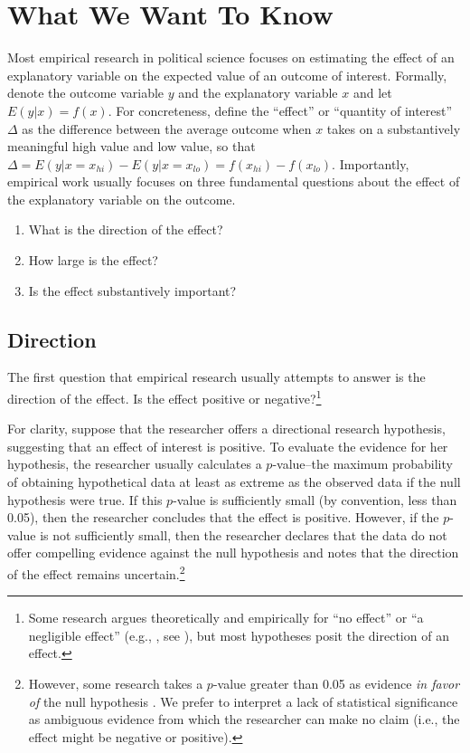 \documentclass[12pt]{article}
\begin{document}
\section*{What We Want To Know}

Most empirical research in political science focuses on estimating the effect of an explanatory variable on the expected value of an outcome of interest. Formally, denote the outcome variable $y$ and the explanatory variable $x$ and let $E(y | x) = f(x)$. For concreteness, define the ``effect'' or ``quantity of interest'' $\Delta$ as the difference between the average outcome when $x$ takes on a substantively meaningful high value and low value, so that $\Delta = E(y | x = x_{hi}) - E(y | x = x_{lo}) = f(x_{hi}) - f(x_{lo})$. Importantly, empirical work usually focuses on three fundamental questions about the effect of the explanatory variable on the outcome.

\begin{enumerate}
\item What is the direction of the effect?
\item How large is the effect?
\item Is the effect substantively important?
\end{enumerate}

\subsection*{Direction}

The first question that empirical research usually attempts to answer is the direction of the effect. Is the effect positive or negative?\footnote{Some research argues theoretically and empirically for ``no effect'' or ``a negligible effect'' (e.g., \citealt{KamPalmer2008}, see \citealt{Rainey2014a}), but most hypotheses posit the direction of an effect.} 

For clarity, suppose that the researcher offers a directional research hypothesis, suggesting that an effect of interest is positive. To evaluate the evidence for her hypothesis, the researcher usually calculates a $p$-value--the maximum probability of obtaining hypothetical data at least as extreme as the observed data if the null hypothesis were true. If this $p$-value is sufficiently small (by convention, less than 0.05), then the researcher concludes that the effect is positive. However, if the $p$-value is not sufficiently small, then the researcher declares that the data do not offer compelling evidence against the null hypothesis and notes that the direction of the effect remains uncertain.\footnote{However, some research takes a $p$-value greater than 0.05 as evidence \textit{in favor of} the null hypothesis \citep{Rainey2014a}. We prefer to interpret a lack of statistical significance as ambiguous evidence from which the researcher can make no claim (i.e., the effect might be negative or positive).}
\end{document}
